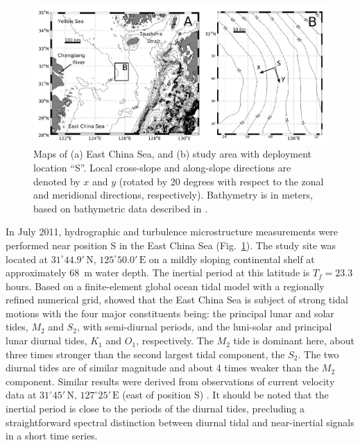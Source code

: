 \begin{figure}
  \noindent\includegraphics[width=40pc]{studyside.pdf}
  \caption{Maps of (a) East China Sea, and (b) study area with
    deployment location ``S''. Local cross-slope and along-slope
    directions are denoted by $x$ and $y$ (rotated by 20 degrees with
    respect to the zonal and meridional directions,
    respectively). Bathymetry is in meters, based on bathymetric data
    described in \cite{Choietal2002a}.}
  \label{studysite}
\end{figure}

In July 2011, hydrographic and turbulence microstructure measurements
were performed near position S in the East China Sea
(Fig.\ \ref{studysite}). The study site was located at $31^\circ
44.9'\,\text{N}, \, 125^\circ 50.0'\,\text{E}$ on a mildly sloping
continental shelf at approximately 68~m water depth. The inertial
period at this latitude is $T_f = 23.3$ hours. Based on a
finite-element global ocean tidal model with a regionally refined
numerical grid, \cite{Lefevreetal2000} showed that the East China Sea
is subject of strong tidal motions with the four major constituents
being: the principal lunar and solar tides, $M_2$ and $S_2$, with
semi-diurnal periods, and the luni-solar and principal lunar diurnal
tides, $K_1$ and $O_1$, respectively. The $M_2$ tide is dominant here,
about three times stronger than the second largest tidal component,
the $S_2$. The two diurnal tides are of similar magnitude and about 4
times weaker than the $M_2$ component. Similar results were derived from 
observations of current velocity data at  $31^\circ 45'\,\text{N}, \, 127^\circ 
25'\,\text{E}$ (east of position S) \citep[][]{Yoshikawaetal2012a}. It should 
be noted that the inertial period is close to the periods of the diurnal tides,
precluding a straightforward spectral distinction between diurnal
tidal and near-inertial signals in a short time series.

